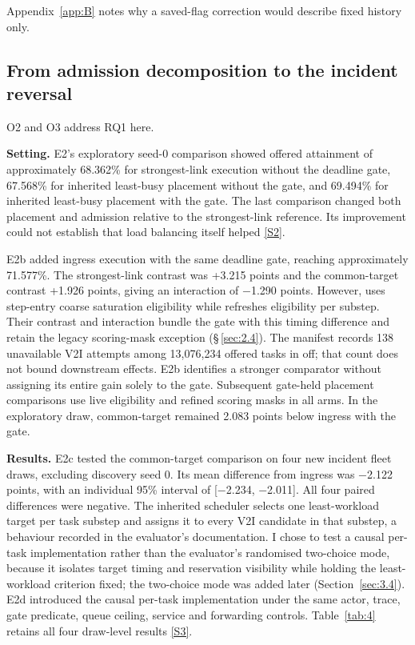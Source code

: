 \documentclass[12pt,a4paper]{article}
\begin{document}
Appendix~\ref{app:B} notes why a saved-flag correction would describe fixed history only.

\FloatBarrier
\subsection{From admission decomposition to the incident reversal}\label{sec:3.2}

O2 and O3 address RQ1 here.

\textbf{Setting.} E2's exploratory seed-0 comparison showed offered attainment of approximately 68.362\% for strongest-link execution without the deadline gate, 67.568\% for inherited least-busy placement without the gate, and 69.494\% for inherited least-busy placement with the gate. The last comparison changed both placement and admission relative to the strongest-link reference. Its improvement could not establish that load balancing itself helped \hyperref[source-s2]{[S2]}.

E2b added ingress execution with the same deadline gate, reaching approximately 71.577\%. The strongest-link contrast was +3.215 points and the common-target contrast +1.926 points, giving an interaction of \ensuremath{-}1.290 points. However,  uses step-entry coarse saturation eligibility while  refreshes eligibility per substep. Their contrast and interaction bundle the gate with this timing difference and retain the legacy scoring-mask exception (\S\,\ref{sec:2.4}). The manifest records 138 unavailable V2I attempts among 13,076,234 offered tasks in off; that count does not bound downstream effects. E2b identifies a stronger comparator without assigning its entire gain solely to the gate. Subsequent gate-held placement comparisons use live eligibility and refined scoring masks in all arms. In the exploratory draw, common-target remained 2.083 points below ingress with the gate.

\textbf{Results.} E2c tested the common-target comparison on four new incident fleet draws, excluding discovery seed 0. Its mean difference from ingress was \ensuremath{-}2.122 points, with an individual 95\% interval of [\ensuremath{-}2.234, \ensuremath{-}2.011]. All four paired differences were negative. The inherited scheduler selects one least-workload target per task substep and assigns it to every V2I candidate in that substep, a behaviour recorded in the evaluator's documentation. I chose to test a causal per-task implementation rather than the evaluator's randomised two-choice mode, because it isolates target timing and reservation visibility while holding the least-workload criterion fixed; the two-choice mode was added later (Section~\ref{sec:3.4}). E2d introduced the causal per-task implementation under the same actor, trace, gate predicate, queue ceiling, service and forwarding controls. Table~\ref{tab:4} retains all four draw-level results \hyperref[source-s3]{[S3]}.
\end{document}
